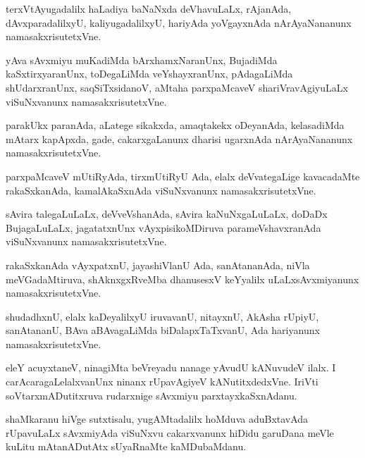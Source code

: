 \documentclass{article}
\begin{document}
\begin{mn}
terxVtAyugadalilx haLadiya baNaNxda deVhavuLaLx, rAjanAda,
dAvxparadalilxyU, kaliyugadalilxyU, hariyAda yoVgayxnAda
nArAyaNananunx namasakxrisutetxVne.
\end{mn}

\begin{mn}
yAva sAvxmiyu muKadiMda bArxhamxNaranUnx, BujadiMda kaSxtirxyaranUnx,
toDegaLiMda veYshayxranUnx, pAdagaLiMda shUdarxranUnx, saqSiTxsidanoV,
aMtaha parxpaMcaveV shariVravAgiyuLaLx viSuNxvanunx namasakxrisutetxVne.
\end{mn}

\begin{mn}%
parakUkx paranAda, aLatege sikakxda, amaqtakekx oDeyanAda, kelasadiMda
mAtarx kapApxda, gade, cakarxgaLanunx dharisi ugarxnAda nArAyaNananunx namasakxrisutetxVne.
\end{mn}

\begin{mn}%
parxpaMcaveV mUtiRyAda, tirxmUtiRyU Ada, elalx deVvategaLige
kavacadaMte rakaSxkanAda, kamalAkaSxnAda viSuNxvanunx namasakxrisutetxVne.
\end{mn}

\begin{mn}
sAvira talegaLuLaLx, deVveVshanAda, sAvira kaNuNxgaLuLaLx, doDaDx
BujagaLuLaLx, jagatatxnUnx vAyxpisikoMDiruva parameVshavxranAda
viSuNxvanunx namasakxrisutetxVne.
\end{mn}

\begin{mn}
rakaSxkanAda vAyxpatxnU, jayashiVlanU Ada, sanAtananAda, niVla
meVGadaMtiruva, shAknxgxRveMba dhanusesxV keYyalilx uLaLxsAvxmiyanunx namasakxrisutetxVne.
\end{mn}

\begin{mn}%
shudadhxnU, elalx kaDeyalilxyU iruvavanU, nitayxnU, AkAsha rUpiyU,
sanAtananU, BAva aBAvagaLiMda biDalapxTaTxvanU, Ada hariyanunx namasakxrisutetxVne.
\end{mn}

\begin{mn}%
eleY acuyxtaneV, ninagiMta beVreyadu nanage yAvudU kANuvudeV ilalx. I
carAcaragaLelalxvanUnx ninanx rUpavAgiyeV kANutitxdedxVne. IriVti
soVtarxmADutitxruva rudarxnige sAvxmiyu parxtayxkaSxnAdanu.
\end{mn}

\begin{mn}
shaMkaranu hiVge sutxtisalu, yugAMtadalilx hoMduva aduBxtavAda
rUpavuLaLx sAvxmiyAda viSuNxvu cakarxvanunx hiDidu garuDana meVle
kuLitu mAtanADutAtx sUyaRnaMte kaMDubaMdanu.
\end{mn}
\end{document}
